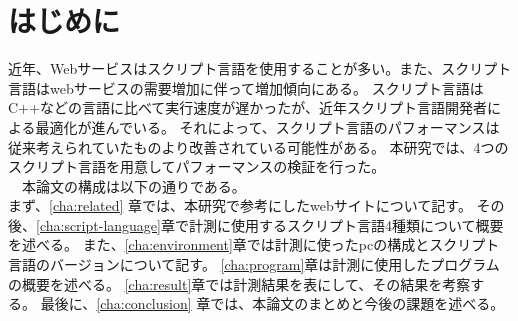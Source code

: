 \chapter{はじめに}
\label{cha:intro}
近年、Webサービスはスクリプト言語を使用することが多い。また、スクリプト言語はwebサービスの需要増加に伴って増加傾向にある。
スクリプト言語はC++などの言語に比べて実行速度が遅かったが、近年スクリプト言語開発者による最適化が進んでいる。
それによって、スクリプト言語のパフォーマンスは従来考えられていたものより改善されている可能性がある。
本研究では、4つのスクリプト言語を用意してパフォーマンスの検証を行った。\\
　本論文の構成は以下の通りである。\\
まず、\ref{cha:related} 章では、本研究で参考にしたwebサイトについて記す。
その後、\ref{cha:script-language}章で計測に使用するスクリプト言語4種類について概要を述べる。
また、\ref{cha:environment}章では計測に使ったpcの構成とスクリプト言語のバージョンについて記す。
\ref{cha:program}章は計測に使用したプログラムの概要を述べる。
\ref{cha:result}章では計測結果を表にして、その結果を考察する。
最後に、\ref{cha:conclusion} 章では、本論文のまとめと今後の課題を述べる。